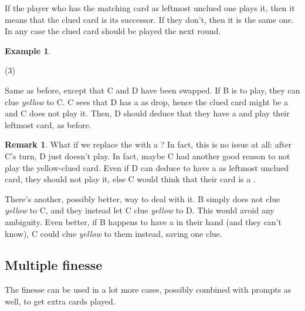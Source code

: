 \documentclass[a4paper]{article}
\theoremstyle{plain}
\theoremstyle{definition}
\newtheorem{remark}[theorem]{Remark}
\newtheorem{example}[theorem]{Example}
\begin{document}
If the player who has the matching card as leftmost unclued one plays it, then it means that the clued card is its successor. If they don't, then it is the same one. In any case the clued card should be played the next round.

\begin{example}
	\hfill
	\begin{tasks}(3)
		\task[+]      
		\task[A]    
		\task[B]    
		\task[C]    
		\task[D]    
		\task[E]    
	\end{tasks}
	
	Same as before, except that C and D have been swapped. If B is to play, they can clue \textit{yellow} to C. C sees that D has a  as drop, hence the clued card might be a  and C does not play it. Then, D should deduce that they have a  and play their leftmost card, as before.
\end{example}

\begin{remark}
	What if we replace the  with a ? In fact, this is no issue at all: after C's turn, D just doesn't play. In fact, maybe C had another good reason to not play the yellow-clued card. Even if D can deduce to have a  as leftmost unclued card, they should not play it, else C would think that their card is a .
	
	There's another, possibly better, way to deal with it. B simply does not clue \textit{yellow} to C, and they instead let C clue \textit{yellow} to D. This would avoid any ambiguity. Even better, if B happens to have a  in their hand (and they can't know), C could clue \textit{yellow} to them instead, saving one clue.
\end{remark}

\subsection{Multiple finesse}

The finesse can be used in a lot more cases, possibly combined with prompts as well, to get extra cards played.
\end{document}

